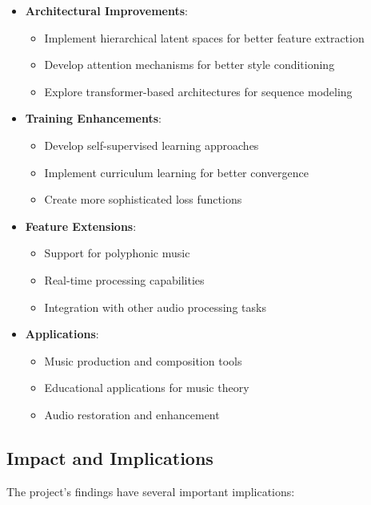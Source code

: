 \begin{itemize}
    \item \textbf{Architectural Improvements}:
    \begin{itemize}
        \item Implement hierarchical latent spaces for better feature extraction
        \item Develop attention mechanisms for better style conditioning
        \item Explore transformer-based architectures for sequence modeling
    \end{itemize}
    
    \item \textbf{Training Enhancements}:
    \begin{itemize}
        \item Develop self-supervised learning approaches
        \item Implement curriculum learning for better convergence
        \item Create more sophisticated loss functions
    \end{itemize}
    
    \item \textbf{Feature Extensions}:
    \begin{itemize}
        \item Support for polyphonic music
        \item Real-time processing capabilities
        \item Integration with other audio processing tasks
    \end{itemize}
    
    \item \textbf{Applications}:
    \begin{itemize}
        \item Music production and composition tools
        \item Educational applications for music theory
        \item Audio restoration and enhancement
    \end{itemize}
\end{itemize}

\subsection{Impact and Implications}
The project's findings have several important implications:


